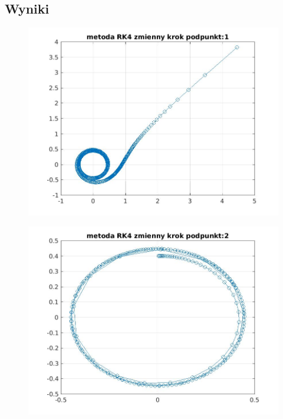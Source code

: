 \documentclass[a4paper, 11pt]{article}
\begin{document}
\subsection{Wyniki}
\begin{figure}[htp]
\centering
\includegraphics[width = 15cm]{2d/metoda RK4 zmienny krok podpunkt:1.jpg}
\end{figure}
\begin{figure}[htp]
\centering
\includegraphics[width = 15cm]{2d/metoda RK4 zmienny krok podpunkt:2.jpg}
\end{figure}
\end{document}
